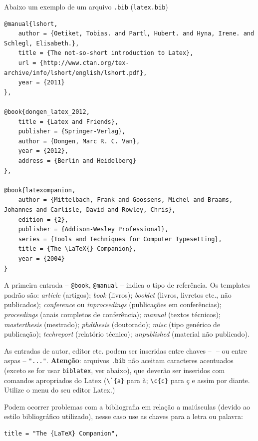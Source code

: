 Abaixo um exemplo de um arquivo \texttt{.bib} (\texttt{latex.bib}) \label{latex-bib}

\begin{verbatim}
@manual{lshort,
    author = {Oetiket, Tobias. and Partl, Hubert. and Hyna, Irene. and Schlegl, Elisabeth.},
    title = {The not-so-short introduction to Latex},
    url = {http://www.ctan.org/tex-archive/info/lshort/english/lshort.pdf},
    year = {2011}
},

@book{dongen_latex_2012,
	title = {Latex and Friends},
	publisher = {Springer-Verlag},
	author = {Dongen, Marc R. C. Van},
	year = {2012},
	address = {Berlin and Heidelberg}
},

@book{latexompanion,
    author = {Mittelbach, Frank and Goossens, Michel and Braams, Johannes and Carlisle, David and Rowley, Chris},
    edition = {2},
    publisher = {Addison-Wesley Professional},
    series = {Tools and Techniques for Computer Typesetting},
    title = {The \LaTeX{} Companion},
    year = {2004}
}

\end{verbatim}

A primeira entrada -- \verb+@book+, \verb+@manual+ -- indica o tipo de referência. Os templates padrão são: \textit{article} (artigos); \textit{book} (livros); \textit{booklet} (livros, livretos etc., não publicados); \textit{conference} ou \textit{inproceedings} (publicações em conferências); \textit{proceedings} (anais completos de conferência); \textit{manual} (textos técnicos); \textit{masterthesis} (mestrado); \textit{phdthesis} (doutorado); \textit{misc} (tipo genérico de publicação); \textit{techreport} (relatório técnico); \textit{unpublished} (material não publicado).

As entradas de autor, editor etc. podem ser inseridas entre chaves -- ${}$ -- ou entre aspas -- \verb+"..."+. 
\textbf{Atenção}: arquivos \texttt{.bib} não aceitam caracteres acentuados (exceto se for usar \texttt{biblatex}, ver abaixo), que deverão ser inseridos com comandos apropriados do Latex (\verb+\`{a}+ para à; \verb+\c{c}+ para ç e assim por diante. Utilize o menu do seu editor Latex.)

Podem ocorrer problemas com a bibliografia em relação a maiúsculas (devido ao estilo bibliográfico utilizado), nesse caso use as chaves para a letra ou palavra:

\begin{verbatim}
title = "The {LaTeX} Companion",
\end{verbatim}

